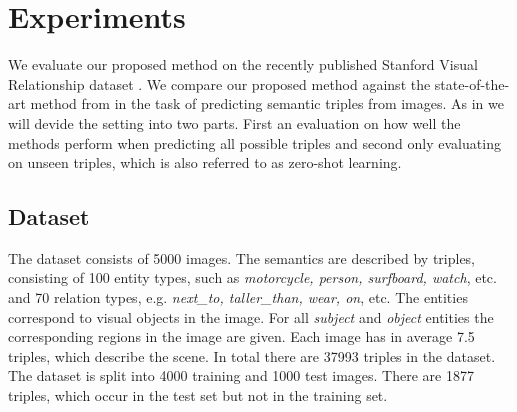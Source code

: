 \documentclass[runningheads,a4paper]{llncs}
\begin{document}


\section{Experiments}
\label{section_experiments}
We evaluate our proposed method on the recently published Stanford Visual Relationship dataset \cite{visual}. We compare our proposed method against the state-of-the-art method from \cite{visual} in the task of predicting semantic triples from images. As in \cite{visual} we will devide the setting into two parts. First an evaluation on how well the methods perform when predicting all possible triples and second only evaluating on unseen triples, which is also referred to as zero-shot learning.



\subsection{Dataset}

The dataset consists of 5000 images. The semantics are described by triples, consisting of 100 entity types, such as \textit{motorcycle, person, surfboard, watch}, etc. and 70 relation types, e.g. \textit{next\_to, taller\_than, wear, on}, etc. The entities correspond to visual objects in the image. For all \textit{subject} and \textit{object} entities the corresponding regions in the image are given. Each image has in average 7.5 triples, which describe the scene. In total there are 37993 triples in the dataset. The dataset is split into 4000 training and 1000 test images. There are 1877 triples, which occur in the test set but not in the training set.


%
\end{document}
